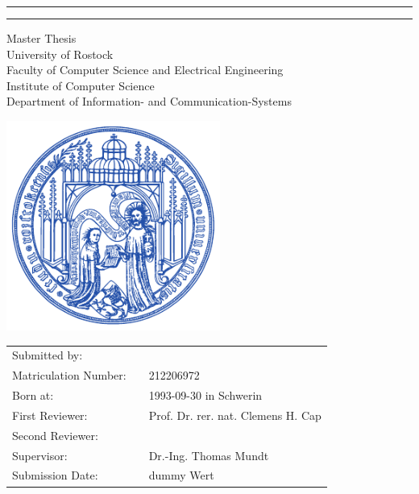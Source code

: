 \begin{titlepage}

	\begin{center}
		
		\hrule
		\vspace{0.5cm}
		\LARGE {\bfseries \thetitle}
		\vspace{0.5cm}
		\hrule
		
		\vspace{0.8cm}
		\Large {Master Thesis}\\
		\vspace{1.0cm}
		\large {University of Rostock\\
		Faculty of Computer Science and Electrical Engineering\\
		Institute of Computer Science\\
		Department of Information- and Communication-Systems}
		
		\vfill
		\includegraphics[width=7cm]{style/UNI-Logo.pdf}
		
	\end{center}
	
	\vfill
	\large
	\begin{tabular}{lcl}
		Submitted by: &&  \theauthor \\
		Matriculation Number: && 212206972\\
		Born at: && 1993-09-30 in Schwerin\\
		First Reviewer: && Prof. Dr. rer. nat. Clemens H. Cap\\
		Second Reviewer: && \\
		Supervisor: && Dr.-Ing. Thomas Mundt\\
		Submission Date: && \alert{dummy Wert}
	\end{tabular}
	\normalsize
	
	
\end{titlepage}